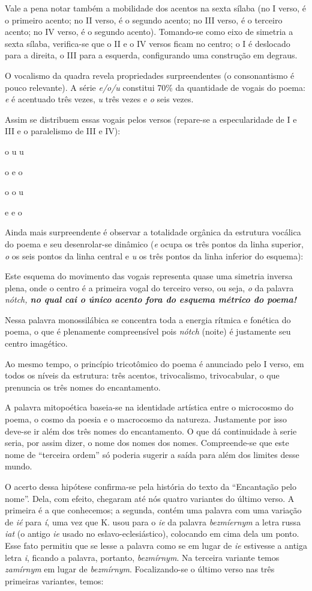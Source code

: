 Vale a pena notar também a mobilidade dos acentos na sexta sílaba (no I
verso, é o primeiro acento; no II verso, é o segundo acento; no III
verso, é o terceiro acento; no IV verso, é o segundo acento). Tomando-se
como eixo de simetria a sexta sílaba, verifica-se que o II e o IV versos
ficam no centro; o I é deslocado para a direita, o III para a esquerda,
configurando uma construção em degraus.

O vocalismo da quadra revela propriedades surpreendentes (o
consonantismo é pouco relevante). A série \emph{e/o/u} constitui 70\% da
quantidade de vogais do poema: \emph{e} é acentuado três vezes, \emph{u}
três vezes e \emph{o} seis vezes.

Assim se distribuem essas vogais pelos versos (repare-se a
especularidade de I e III e o paralelismo de III e IV):

o u u

o e o

o o u

e e o

Ainda mais surpreendente é observar a totalidade orgânica da estrutura
vocálica do poema e seu desenrolar-se dinâmico (\emph{e} ocupa os três
pontos da linha superior, \emph{o} os seis pontos da linha central e
\emph{u} os três pontos da linha inferior do esquema):

Este esquema do movimento das vogais representa quase uma simetria
inversa plena, onde o centro é a primeira vogal do terceiro verso, ou
seja, \emph{o} da palavra \emph{nótch, \textbf{no qual cai o único
acento fora do esquema métrico do poema!}}

Nessa palavra monossilábica se concentra toda a energia rítmica e
fonética do poema, o que é plenamente compreensível pois \emph{nótch}
(noite) é justamente seu centro imagético.

Ao mesmo tempo, o princípio tricotômico do poema é anunciado pelo I
verso, em todos os níveis da estrutura: três acentos, trivocalismo,
trivocabular, o que prenuncia os três nomes do encantamento.

A palavra mitopoética baseia-se na identidade artística entre o
microcosmo do poema, o cosmo da poesia e o macrocosmo da natureza.
Justamente por isso deve-se ir além dos três nomes do encantamento. O
que dá continuidade à serie seria, por assim dizer, o nome dos nomes dos
nomes. Compreende-se que este nome de ``terceira ordem'' só poderia
sugerir a saída para além dos limites desse mundo.

O acerto dessa hipótese confirma-se pela história do texto da
``Encantação pelo nome''. Dela, com efeito, chegaram até nós quatro
variantes do último verso. A primeira é a que conhecemos; a segunda,
contém uma palavra com uma variação de \emph{ié} para \emph{í}, uma vez
que K. usou para o \emph{{ie}} da palavra \emph{bezm{íe}rnym} a letra
russa \emph{iat} (o antigo \emph{ie} usado no eslavo-eclesiástico),
colocando em cima dela um ponto. Esse fato permitiu que se lesse a
palavra como se em lugar de \emph{{ie}} estivesse a antiga letra
\emph{i}, ficando a palavra, portanto, \emph{bezmírnym}. Na terceira
variante temos \emph{zamírnym} em lugar de \emph{bezmírnym}.
Focalizando-se o último verso nas três primeiras variantes, temos:

